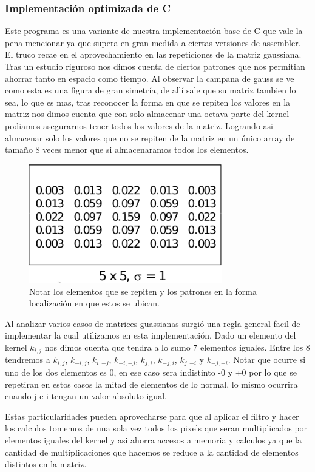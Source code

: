 \subsubsection{Implementación optimizada de C}

Este programa es una variante de nuestra implementación base de C que vale la pena mencionar ya que supera en gran medida a ciertas versiones de assembler. El truco recae en el aprovechamiento en las repeticiones de la matriz gaussiana. Tras un estudio riguroso nos dimos cuenta de ciertos patrones que nos permitian ahorrar tanto en espacio como tiempo. Al observar la campana de gauss se ve como esta es una figura de gran simetría, de allí sale que su matriz tambien lo sea, lo que es mas, tras reconocer la forma en que se repiten los valores en la matriz nos dimos cuenta que con solo almacenar una octava parte del kernel podiamos asegurarnos tener todos los valores de la matriz. Logrando asi almacenar solo los valores que no se repiten de la matriz en un único array de tamaño 8 veces menor que si almacenaramos todos los elementos.


\begin{figure}[H]
 	\centering
 	\includegraphics[width=0.75\textwidth]{./imgs/gaussian_kernel.png}
	\caption{\footnotesize Notar los elementos que se repiten y los patrones en la forma localización en que estos se ubican.}
	\label{fig:lineplot.diff}
\end{figure}


Al analizar varios casos de matrices guassianas surgió una regla general facil de implementar la cual utilizamos en esta implementación. Dado un elemento del kernel $k_{i,j}$ nos dimos cuenta que tendra a lo sumo 7 elementos iguales. Entre los 8 tendremos a $k_{i,j}$, $k_{-i,j}$, $k_{i,-j}$, $k_{-i,-j}$, $k_{j,i}$, $k_{-j,i}$, $k_{j,-i}$ y $k_{-j,-i}$. Notar que ocurre si uno de los dos elementos es 0, en ese caso sera indistinto -0 y +0 por lo que se repetiran en estos casos la mitad de elementos de lo normal, lo mismo ocurrira cuando j e i tengan un valor absoluto igual.

Estas particularidades pueden aprovecharse para que al aplicar el filtro y hacer los calculos tomemos de una sola vez todos los pixels que seran multiplicados por elementos iguales del kernel y asi ahorra accesos a memoria y calculos ya que la cantidad de multiplicaciones que hacemos se reduce a la cantidad de elementos distintos en la matriz.

